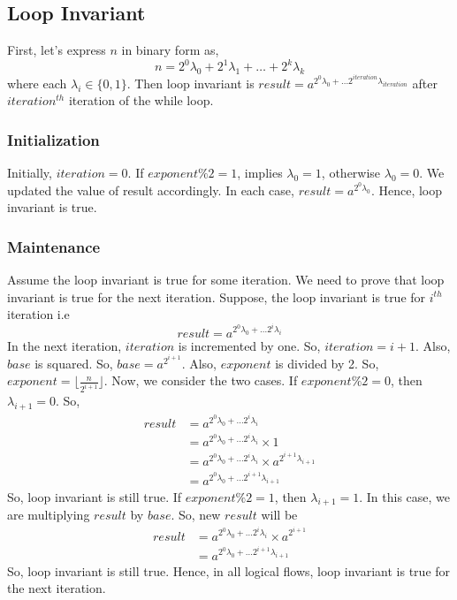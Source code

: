\documentclass{article}
\begin{document}
\subsection*{Loop Invariant}
First, let's express $n$ in binary form as,
$$n = 2^0\lambda_0 + 2^1\lambda_1 + \ldots + 2^k\lambda_k$$
where each $\lambda_i \in \{0,1\}$. Then loop invariant is $result = a^{2^0\lambda_0 + \ldots 2^{iteration}\lambda_{iteration}}$ after $iteration^{th}$ iteration of the while loop.

\subsubsection*{Initialization}
Initially, $iteration = 0$. If $exponent\%2 = 1$, implies $\lambda_0 = 1$, otherwise $\lambda_0 = 0$. We updated the value of result accordingly. In each case, $result = a^{2^0\lambda_0}$. Hence, loop invariant is true.

\subsubsection*{Maintenance}
Assume the loop invariant is true for some iteration. We need to prove that loop invariant is true for the next iteration. Suppose, the loop invariant is true for $i^{th}$ iteration i.e $$result = a^{2^0\lambda_0 + \ldots 2^{i}\lambda_{i}}$$
In the next iteration, $iteration$ is incremented by one. So, $iteration = i + 1$. Also, $base$ is squared. So, $base = a^{2^{i+1}}$. Also, $exponent$ is divided by 2. So, $exponent = \lfloor \frac{n}{2^{i+1}} \rfloor$. Now, we consider the two cases. If $exponent\%2 = 0$, then $\lambda_{i+1} = 0$. So,
\begin{align*}
    result &= a^{2^0\lambda_0 + \ldots 2^{i}\lambda_{i}} \\ 
            &= a^{2^0\lambda_0 + \ldots 2^{i}\lambda_{i}} \times 1 \\ 
            &= a^{2^0\lambda_0 + \ldots 2^{i}\lambda_{i}} \times a^{2^{i+1} \lambda_{i+1}} \\
            &= a^{2^0\lambda_0 + \ldots 2^{i+1}\lambda_{i+1}}
\end{align*}
So, loop invariant is still true. If $exponent\%2 = 1$, then $\lambda_{i+1} = 1$. In this case, we are multiplying $result$ by $base$. So, new $result$ will be
\begin{align*}
    result &= a^{2^0\lambda_0 + \ldots 2^{i}\lambda_{i}} \times a^{2^{i+1}} \\
        &= a^{2^0\lambda_0 + \ldots 2^{i+1}\lambda_{i+1}}
\end{align*}
So, loop invariant is still true. Hence, in all logical flows, loop invariant is true for the next iteration.
\end{document}
